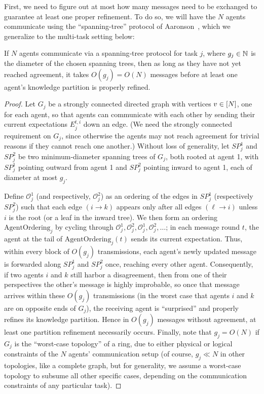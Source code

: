 First, we need to figure out at most how many messages need to be exchanged to guarantee at least one proper refinement.
To do so, we will have the $N$ agents communicate using the ``spanning-tree'' protocol of Aaronson~\citep[\S 3.3]{aaronson2005complexity}, which we generalize to the multi-task setting below:

\begin{lemma}\label{lem:spanning-tree-refinement}
If $N$ agents communicate via a spanning‐tree protocol for task $j$, where
$g_j \in \mathbb{N}$ is the diameter of the chosen spanning trees, then as long as they have not yet reached agreement, it takes $O(g_j)= O(N)$ messages before at least one agent's knowledge partition is properly refined.
\end{lemma}
\begin{proof}
Let $G_j$ be a strongly connected directed graph with vertices $v\in[N]$, one for each agent, so that agents can communicate with each other by sending their current expectations $E^{t,i}_j$ down an edge.
(We need the strongly connected requirement on $G_j$, since otherwise the agents may not reach agreement for trivial reasons if they cannot reach one another.) 
Without loss of generality, let ${SP}^1_j$ and ${SP}^2_j$ be two minimum‐diameter spanning trees of $G_j$, both rooted at agent 1, with ${SP}^1_j$ pointing outward from agent 1 and ${SP}^2_j$ pointing inward to agent 1, each of diameter at most $g_j$.

Define $\mathcal{O}^1_j$ (and respectively, $\mathcal{O}^2_j$) as an ordering of the edges in ${SP}^1_j$ (respectively ${SP}^2_j$) such that each edge $(i\!\to\!k)$ appears only after all edges $(\ell\!\to\!i)$ unless $i$ is the root (or a leaf in the inward tree).
We then form an ordering $\mathrm{AgentOrdering}_j$ by cycling through $\mathcal{O}^1_j,\mathcal{O}^2_j,\mathcal{O}^1_j,\mathcal{O}^2_j,\dots$; in each message round $t$, the agent at the tail of $\mathrm{AgentOrdering}_j(t)$ sends its current expectation.
Thus, within every block of $O(g_j)$ transmissions, each agent's newly updated message is forwarded along ${SP}^1_j$ and ${SP}^2_j$ once, reaching every other agent.
Consequently, if two agents $i$ and $k$ still harbor a disagreement, then from one of their perspectives the other's message is highly improbable, so once that message arrives within these $O(g_j)$ transmissions (in the worst case that agents $i$ and $k$ are on opposite ends of $G_j$), the receiving agent is ``surprised'' and properly refines its knowledge partition.  
Hence in $O(g_j)$ messages without agreement, at least one partition refinement necessarily occurs.
Finally, note that $g_j = O(N)$ if $G_j$ is the ``worst-case topology'' of a ring, due to either physical or logical constraints of the $N$ agents' communication setup (of course, $g_j \ll N$ in other topologies, like a complete graph, but for generality, we assume a worst-case topology to subsume all other specific cases, depending on the communication constraints of any particular task).
\end{proof}

